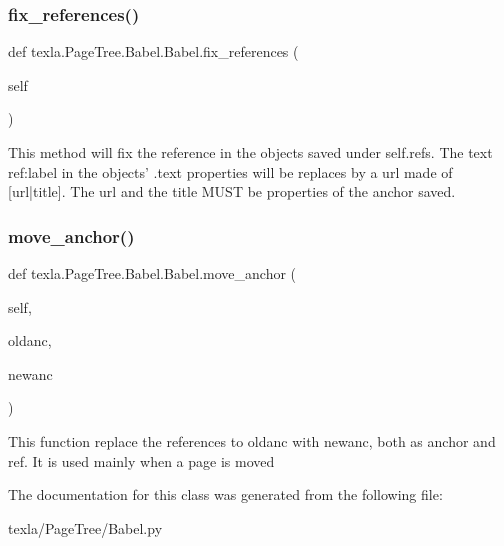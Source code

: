 \subsubsection{\texorpdfstring{fix\+\_\+references()}{fix\_references()}}
{\footnotesize\ttfamily def texla.\+Page\+Tree.\+Babel.\+Babel.\+fix\+\_\+references (\begin{DoxyParamCaption}\item[{}]{self }\end{DoxyParamCaption})}

\begin{DoxyVerb}This method will fix the reference in the objects saved under
self.refs. The text {{ref:label}} in the objects' .text properties
will be replaces by a url made of [url|title]. The url and the title
MUST be properties of the anchor saved.
\end{DoxyVerb}
 \hypertarget{classtexla_1_1PageTree_1_1Babel_1_1Babel_a0c75743fd9b66c057b5a27900ccb8e32}{}\label{classtexla_1_1PageTree_1_1Babel_1_1Babel_a0c75743fd9b66c057b5a27900ccb8e32} 
\subsubsection{\texorpdfstring{move\+\_\+anchor()}{move\_anchor()}}
{\footnotesize\ttfamily def texla.\+Page\+Tree.\+Babel.\+Babel.\+move\+\_\+anchor (\begin{DoxyParamCaption}\item[{}]{self,  }\item[{}]{oldanc,  }\item[{}]{newanc }\end{DoxyParamCaption})}

\begin{DoxyVerb}This function replace the references to oldanc with newanc,
both as anchor and ref. It is used mainly when a page is moved\end{DoxyVerb}
 

The documentation for this class was generated from the following file\+:\begin{DoxyCompactItemize}
\item 
texla/\+Page\+Tree/Babel.\+py\end{DoxyCompactItemize}
